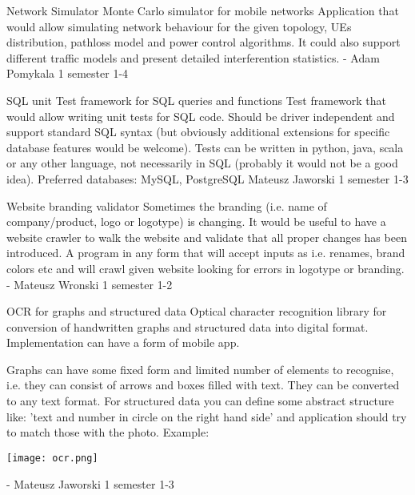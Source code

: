 \begin{project}
{Network Simulator}
{Monte Carlo simulator for mobile networks} 
{ 
Application that would allow simulating network behaviour for the given
topology, UEs distribution, pathloss model and power control algorithms. It
could also support different traffic models and present detailed interferention
statistics.
} 
{-}
{Adam Pomykala}
{1 semester}
{1-4}
\end{project}
\begin{project}
{SQL unit}
{Test framework for SQL queries and functions} 
{ 
Test framework that would allow writing unit tests for SQL code. Should be
driver independent and support standard SQL syntax (but obviously additional
extensions for specific database features would be welcome). Tests can be
written in python, java, scala or any other language, not necessarily in SQL
(probably it would not be a good idea).
}
{Preferred databases: MySQL, PostgreSQL}
{Mateusz Jaworski}
{1 semester}
{1-3}
\end{project}
\begin{project}
{Website branding validator}
{Sometimes the branding (i.e. name of company/product, logo or logotype) is changing. It would be useful to have a website crawler to walk the website and validate that all proper changes has been introduced.} 
{
A program in any form that will accept inputs as i.e. renames, brand colors etc and will crawl given website looking for errors in logotype or branding.
}
{-}
{Mateusz Wronski}
{1 semester}
{1-2}
\end{project}
\begin{project}
{OCR for graphs and structured data}
{Optical character recognition library for conversion of handwritten graphs and structured data into digital format.
Implementation can have a form of mobile app.} 
{ 
Graphs can have some fixed form and limited number of elements to recognise, i.e. 
they can consist of arrows and boxes filled with text. They can be converted to any text format.
For structured data you can define some abstract structure like: 'text and
number in circle on the right hand side' and application should try to match
those with the photo. Example:
\begin{center}\texttt{[image: ocr.png]}\end{center}
}
{-}
{Mateusz Jaworski}
{1 semester}
{1-3}
\end{project}
